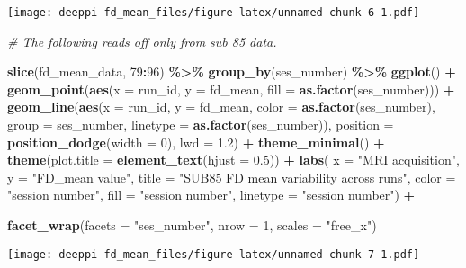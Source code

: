 \documentclass[
]{article}
\newenvironment{Shaded}{\begin{snugshade}}{\end{snugshade}}
\newcommand{\AttributeTok}[1]{\textcolor[rgb]{0.13,0.29,0.53}{#1}}
\newcommand{\CommentTok}[1]{\textcolor[rgb]{0.56,0.35,0.01}{\textit{#1}}}
\newcommand{\DecValTok}[1]{\textcolor[rgb]{0.00,0.00,0.81}{#1}}
\newcommand{\FloatTok}[1]{\textcolor[rgb]{0.00,0.00,0.81}{#1}}
\newcommand{\FunctionTok}[1]{\textcolor[rgb]{0.13,0.29,0.53}{\textbf{#1}}}
\newcommand{\NormalTok}[1]{#1}
\newcommand{\SpecialCharTok}[1]{\textcolor[rgb]{0.81,0.36,0.00}{\textbf{#1}}}
\newcommand{\StringTok}[1]{\textcolor[rgb]{0.31,0.60,0.02}{#1}}
\begin{document}
\texttt{[image: deeppi-fd\_mean\_files/figure-latex/unnamed-chunk-6-1.pdf]}

\begin{Shaded}
\begin{Highlighting}[]
\CommentTok{\# The following reads off only from sub 85 data. }

\FunctionTok{slice}\NormalTok{(fd\_mean\_data, }\DecValTok{79}\SpecialCharTok{:}\DecValTok{96}\NormalTok{) }\SpecialCharTok{\%\textgreater{}\%}
  \FunctionTok{group\_by}\NormalTok{(ses\_number) }\SpecialCharTok{\%\textgreater{}\%}
    \FunctionTok{ggplot}\NormalTok{() }\SpecialCharTok{+} 
    \FunctionTok{geom\_point}\NormalTok{(}\FunctionTok{aes}\NormalTok{(}\AttributeTok{x =}\NormalTok{ run\_id, }\AttributeTok{y =}\NormalTok{ fd\_mean, }\AttributeTok{fill =} \FunctionTok{as.factor}\NormalTok{(ses\_number))) }\SpecialCharTok{+}
    \FunctionTok{geom\_line}\NormalTok{(}\FunctionTok{aes}\NormalTok{(}\AttributeTok{x =}\NormalTok{ run\_id, }\AttributeTok{y =}\NormalTok{ fd\_mean, }\AttributeTok{color =} \FunctionTok{as.factor}\NormalTok{(ses\_number), }
                  \AttributeTok{group =}\NormalTok{ ses\_number, }\AttributeTok{linetype =} \FunctionTok{as.factor}\NormalTok{(ses\_number)), }
              \AttributeTok{position =} \FunctionTok{position\_dodge}\NormalTok{(}\AttributeTok{width =} \DecValTok{0}\NormalTok{), }\AttributeTok{lwd =} \FloatTok{1.2}\NormalTok{) }\SpecialCharTok{+}
    \FunctionTok{theme\_minimal}\NormalTok{() }\SpecialCharTok{+}
    \FunctionTok{theme}\NormalTok{(}\AttributeTok{plot.title =} \FunctionTok{element\_text}\NormalTok{(}\AttributeTok{hjust =} \FloatTok{0.5}\NormalTok{)) }\SpecialCharTok{+}
    \FunctionTok{labs}\NormalTok{(}
    \AttributeTok{x =} \StringTok{"MRI acquisition"}\NormalTok{, }
    \AttributeTok{y =} \StringTok{"FD\_mean value"}\NormalTok{, }
    \AttributeTok{title =} \StringTok{"SUB85 FD mean variability across runs"}\NormalTok{,}
    \AttributeTok{color =} \StringTok{"session number"}\NormalTok{,}
    \AttributeTok{fill =} \StringTok{"session number"}\NormalTok{,}
    \AttributeTok{linetype =} \StringTok{"session number"}\NormalTok{) }\SpecialCharTok{+} 

    \FunctionTok{facet\_wrap}\NormalTok{(}\AttributeTok{facets =} \StringTok{"ses\_number"}\NormalTok{, }\AttributeTok{nrow =} \DecValTok{1}\NormalTok{, }\AttributeTok{scales =} \StringTok{"free\_x"}\NormalTok{) }
\end{Highlighting}
\end{Shaded}

\texttt{[image: deeppi-fd\_mean\_files/figure-latex/unnamed-chunk-7-1.pdf]}
\end{document}
